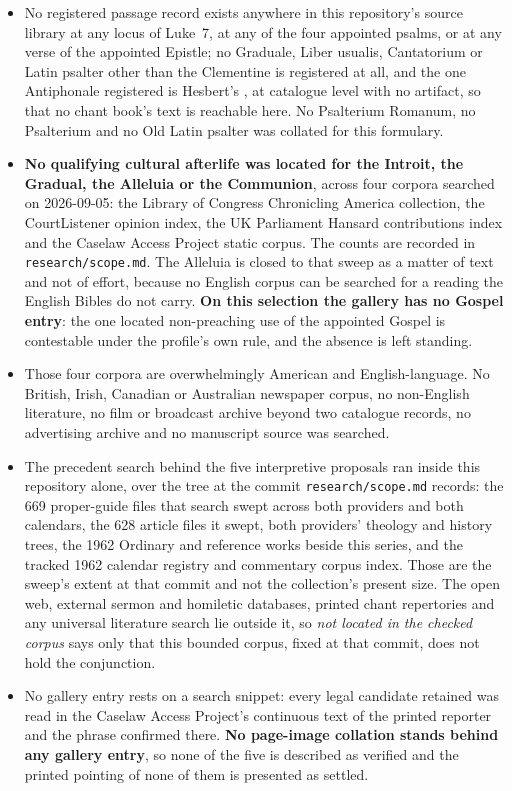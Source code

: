 \begin{itemize}
beyond Wilson, every medieval monastic or diocesan sacramentary and every later
Roman missal.
\item No registered passage record exists anywhere in this repository's source
library at any locus of Luke~7, at any of the four appointed psalms, or at any
verse of the appointed Epistle; no Graduale, Liber usualis, Cantatorium or Latin
psalter other than the Clementine is registered at all, and the one Antiphonale
registered is Hesbert's , at catalogue level
with no artifact, so that no chant book's text is reachable here. No
Psalterium Romanum, no Psalterium  and no Old Latin psalter
was collated for this formulary.
\item \textbf{No qualifying cultural afterlife was located for the Introit, the
Gradual, the Alleluia or the Communion}, across four corpora searched on
2026-09-05: the Library of Congress Chronicling America collection, the
CourtListener opinion index, the UK Parliament Hansard contributions index and the
Caselaw Access Project static corpus. The counts are recorded in
\texttt{research/scope.md}. The Alleluia is closed to that sweep as a matter of
text and not of effort, because no English corpus can be searched for a reading
the English Bibles do not carry. \textbf{On this selection the gallery has no
Gospel entry}: the one located non-preaching use of the appointed Gospel is
contestable under the profile's own rule, and the absence is left standing.
\item Those four corpora are overwhelmingly American and English-language. No
British, Irish, Canadian or Australian newspaper corpus, no non-English
literature, no film or broadcast archive beyond two catalogue records, no
advertising archive and no manuscript source was searched.
\item The precedent search behind the five interpretive proposals ran inside
this repository alone, over the tree at the commit \texttt{research/scope.md}
records: the 669 proper-guide files that search swept across both providers and
both calendars, the 628 article files it swept, both providers' theology and
history trees, the 1962 Ordinary and reference works beside this series, and the
tracked 1962 calendar registry and commentary corpus index. Those are the
sweep's extent at that commit and not the collection's present size. The open
web, external sermon and homiletic databases, printed chant repertories and any
universal literature search lie outside it, so \emph{not located in the checked
corpus} says only that this bounded corpus, fixed at that commit, does not hold
the conjunction.
\item No gallery entry rests on a search snippet: every legal candidate retained
was read in the Caselaw Access Project's continuous text of the printed reporter
and the phrase confirmed there. \textbf{No page-image collation stands behind any
gallery entry}, so none of the five is described as verified and the printed
pointing of none of them is presented as settled.
\end{itemize}

